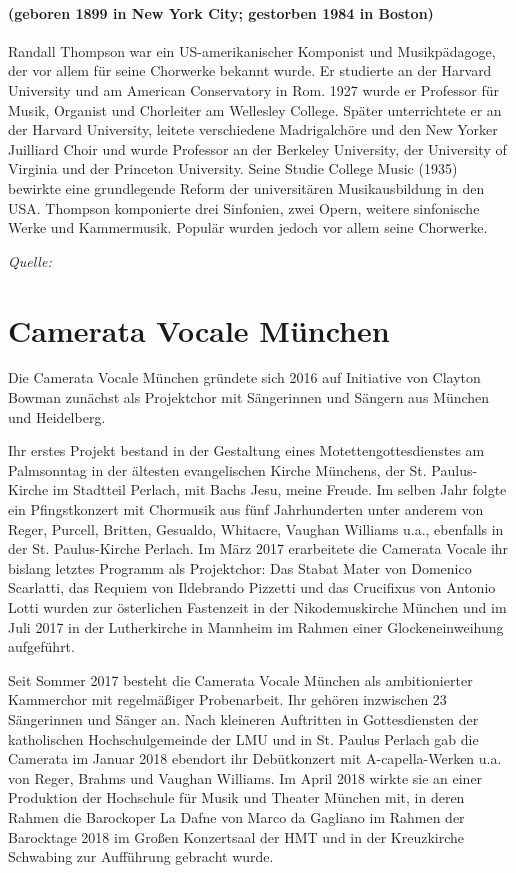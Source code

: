 \documentclass[11pt, ngermanm, titlepage]{article}
\begin{document}
\begin{multicols}{2}
	\paragraph{(geboren 1899 in New York City; gestorben 1984 in Boston) \newline}
	Randall Thompson war ein US-amerikanischer Komponist und Musikpädagoge, der vor allem für seine Chorwerke bekannt wurde. Er studierte an der Harvard University und am American Conservatory in Rom. 1927 wurde er Professor für Musik, Organist und Chorleiter am Wellesley College. Später unterrichtete er an der Harvard University, leitete verschiedene Madrigalchöre und den New Yorker Juilliard Choir und wurde Professor an der Berkeley University, der University of Virginia und der Princeton University. Seine Studie College Music (1935) bewirkte eine grundlegende Reform der universitären Musikausbildung in den USA. Thompson komponierte drei Sinfonien, zwei Opern, weitere sinfonische Werke und Kammermusik. Populär wurden jedoch vor allem seine Chorwerke.
	
	\textit{Quelle:}
	
	
	\section*{Camerata Vocale München}
	Die Camerata Vocale München gründete sich 2016 auf Initiative von Clayton Bowman zunächst als Projektchor mit Sängerinnen und Sängern aus München und Heidelberg.
	
	Ihr erstes Projekt bestand in der Gestaltung eines Motettengottesdienstes am Palmsonntag in der ältesten evangelischen Kirche Münchens, der St. Paulus-Kirche im Stadtteil Perlach, mit Bachs Jesu, meine Freude. Im selben Jahr folgte ein Pfingstkonzert mit Chormusik aus fünf Jahrhunderten unter anderem von Reger, Purcell, Britten, Gesualdo, Whitacre, Vaughan Williams u.a., ebenfalls in der St. Paulus-Kirche Perlach. Im März 2017 erarbeitete die Camerata Vocale ihr bislang letztes Programm als Projektchor: Das Stabat Mater von Domenico Scarlatti, das Requiem von Ildebrando Pizzetti und das Crucifixus von Antonio Lotti wurden zur österlichen Fastenzeit in der Nikodemuskirche München und im Juli 2017 in der Lutherkirche in Mannheim im Rahmen einer Glockeneinweihung aufgeführt.
	
	Seit Sommer 2017 besteht die Camerata Vocale München als ambitionierter Kammerchor mit regelmäßiger Probenarbeit. Ihr gehören inzwischen 23 Sängerinnen und Sänger an. Nach kleineren Auftritten in Gottesdiensten der katholischen Hochschulgemeinde der LMU und in St. Paulus Perlach gab die Camerata im Januar 2018 ebendort ihr Debütkonzert mit A-capella-Werken u.a. von Reger, Brahms und Vaughan Williams. Im April 2018 wirkte sie an einer Produktion der Hochschule für Musik und Theater München mit, in deren Rahmen die Barockoper La Dafne von Marco da Gagliano im Rahmen der Barocktage 2018 im Großen Konzertsaal der HMT und in der Kreuzkirche Schwabing zur Aufführung gebracht wurde.
	

\end{multicols}
\end{document}
